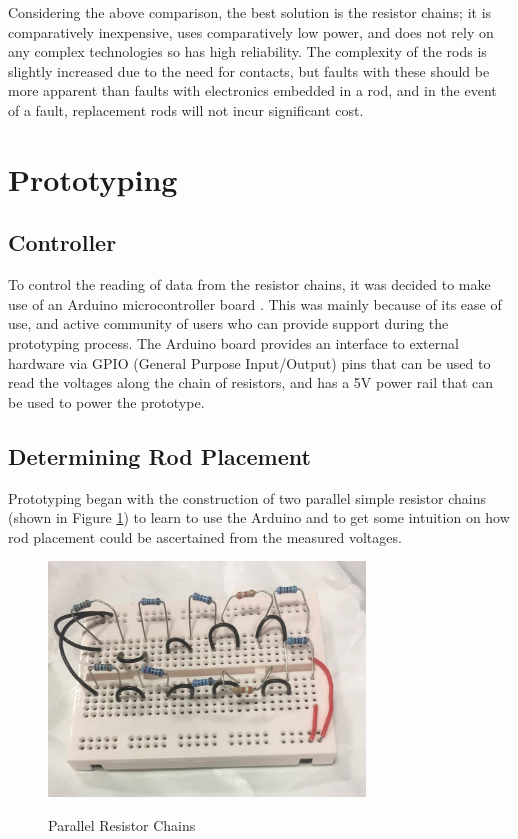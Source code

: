  
Considering the above comparison, the best solution is the resistor chains; it is comparatively inexpensive, uses comparatively low power, and does not rely on any complex technologies so has high reliability. The complexity of the rods is slightly increased due to the need for contacts, but faults with these should be more apparent than faults with electronics embedded in a rod, and in the event of a fault, replacement rods will not incur significant cost.


\section{Prototyping}

\subsection{Controller}
To control the reading of data from the resistor chains, it was decided to make use of an Arduino microcontroller board \cite{ArduinoH73:online}. This was mainly because of its ease of use, and active community of users who can provide support during the prototyping process. The Arduino board provides an interface to external hardware via GPIO (General Purpose Input/Output) pins that can be used to read the voltages along the chain of resistors, and has a 5V power rail that can be used to power the prototype. 

\subsection{Determining Rod Placement}
\label{sec:voltages}
Prototyping began with the construction of two parallel simple resistor chains (shown in Figure \ref{fig:simple_resistor}) to learn to use the Arduino and to get some intuition on how rod placement could be ascertained from the measured voltages. 

\begin{figure}[H]
	\begin{center}
	\includegraphics[width=0.75\textwidth]{simple_resistor_chain.jpg}\\
  	\caption{Parallel Resistor Chains}
    \label{fig:simple_resistor}
    \end{center}
\end{figure}

